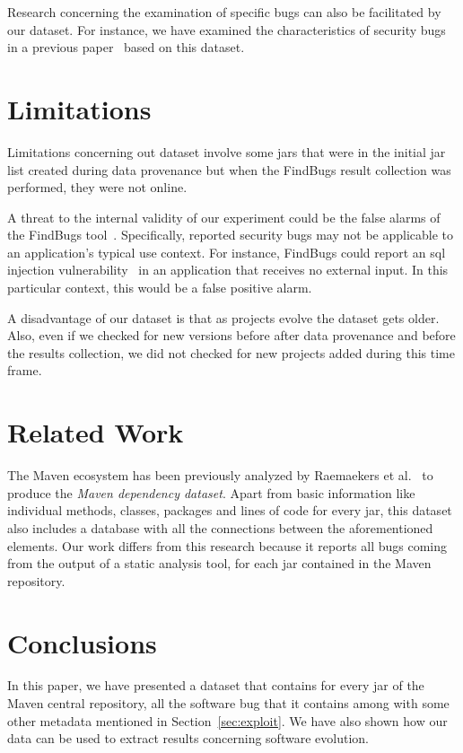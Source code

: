 \documentclass{sig-alternate}
\begin{document}
Research concerning the examination of specific bugs
can also be facilitated by our dataset. For instance,
we have examined the characteristics of security
bugs in a previous paper~\cite{MKLGS13}
based on this dataset.

\section{Limitations}
\label{sec:limit}

Limitations concerning out dataset involve some
{\sc jar}s that were in the initial {\sc jar} list
created during data provenance but when the
FindBugs result collection was performed, they
were not online.

A threat to the internal validity of our experiment could be the false
alarms of the FindBugs tool~\cite{AP10, HP04}.
Specifically, reported security bugs may not
be applicable to an application's typical use context.
For instance, FindBugs could report an {\sc sql}
injection vulnerability~\cite{RL12}
in an application that receives no external input.
In this particular context, this would be a false
positive alarm.

A disadvantage of our dataset is that as projects evolve
the dataset gets older. Also, even if we checked for
new versions before after data provenance and before
the results collection, we did not checked for new
projects added during this time frame.

\section{Related Work}
\label{sec:rel}

The Maven ecosystem has been previously analyzed by
Raemaekers et al.~\cite{RDV13}
to produce the {\it Maven dependency dataset}.
Apart from basic information like individual methods, classes,
packages and lines of code for every {\sc jar}, this dataset
also includes a database with all the
connections between the aforementioned elements.
Our work differs from this research because it
reports all bugs coming from the output of a
static analysis tool, for each {\sc jar}
contained in the Maven repository.

\section{Conclusions}
\label{sec:conc}

In this paper, we have presented a dataset that contains
for every {\sc jar} of the Maven central repository,
all the software bug that it contains among with some
other metadata mentioned in Section~\ref{sec:exploit}.
We have also shown how our data can be
used to extract results concerning software evolution.
\end{document}
